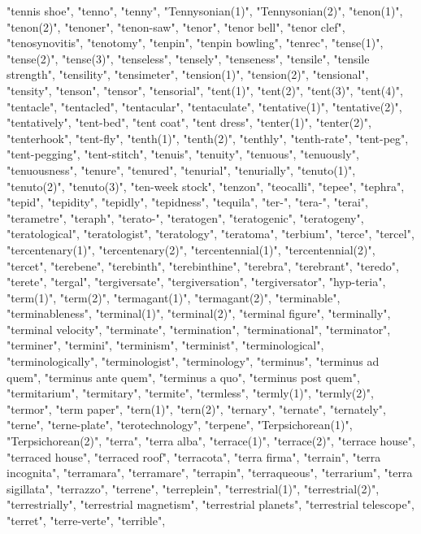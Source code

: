 "tennis shoe",
"tenno",
"tenny",
"Tennysonian(1)",
"Tennysonian(2)",
"tenon(1)",
"tenon(2)",
"tenoner",
"tenon-saw",
"tenor",
"tenor bell",
"tenor clef",
"tenosynovitis",
"tenotomy",
"tenpin",
"tenpin bowling",
"tenrec",
"tense(1)",
"tense(2)",
"tense(3)",
"tenseless",
"tensely",
"tenseness",
"tensile",
"tensile strength",
"tensility",
"tensimeter",
"tension(1)",
"tension(2)",
"tensional",
"tensity",
"tenson",
"tensor",
"tensorial",
"tent(1)",
"tent(2)",
"tent(3)",
"tent(4)",
"tentacle",
"tentacled",
"tentacular",
"tentaculate",
"tentative(1)",
"tentative(2)",
"tentatively",
"tent-bed",
"tent coat",
"tent dress",
"tenter(1)",
"tenter(2)",
"tenterhook",
"tent-fly",
"tenth(1)",
"tenth(2)",
"tenthly",
"tenth-rate",
"tent-peg",
"tent-pegging",
"tent-stitch",
"tenuis",
"tenuity",
"tenuous",
"tenuously",
"tenuousness",
"tenure",
"tenured",
"tenurial",
"tenurially",
"tenuto(1)",
"tenuto(2)",
"tenuto(3)",
"ten-week stock",
"tenzon",
"teocalli",
"tepee",
"tephra",
"tepid",
"tepidity",
"tepidly",
"tepidness",
"tequila",
"ter-",
"tera-",
"terai",
"terametre",
"teraph",
"terato-",
"teratogen",
"teratogenic",
"teratogeny",
"teratological",
"teratologist",
"teratology",
"teratoma",
"terbium",
"terce",
"tercel",
"tercentenary(1)",
"tercentenary(2)",
"tercentennial(1)",
"tercentennial(2)",
"tercet",
"terebene",
"terebinth",
"terebinthine",
"terebra",
"terebrant",
"teredo",
"terete",
"tergal",
"tergiversate",
"tergiversation",
"tergiversator",
"hyp-teria",
"term(1)",
"term(2)",
"termagant(1)",
"termagant(2)",
"terminable",
"terminableness",
"terminal(1)",
"terminal(2)",
"terminal figure",
"terminally",
"terminal velocity",
"terminate",
"termination",
"terminational",
"terminator",
"terminer",
"termini",
"terminism",
"terminist",
"terminological",
"terminologically",
"terminologist",
"terminology",
"terminus",
"terminus ad quem",
"terminus ante quem",
"terminus a quo",
"terminus post quem",
"termitarium",
"termitary",
"termite",
"termless",
"termly(1)",
"termly(2)",
"termor",
"term paper",
"tern(1)",
"tern(2)",
"ternary",
"ternate",
"ternately",
"terne",
"terne-plate",
"terotechnology",
"terpene",
"Terpsichorean(1)",
"Terpsichorean(2)",
"terra",
"terra alba",
"terrace(1)",
"terrace(2)",
"terrace house",
"terraced house",
"terraced roof",
"terracota",
"terra firma",
"terrain",
"terra incognita",
"terramara",
"terramare",
"terrapin",
"terraqueous",
"terrarium",
"terra sigillata",
"terrazzo",
"terrene",
"terreplein",
"terrestrial(1)",
"terrestrial(2)",
"terrestrially",
"terrestrial magnetism",
"terrestrial planets",
"terrestrial telescope",
"terret",
"terre-verte",
"terrible",
